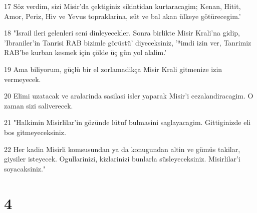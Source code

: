 \par 17 Söz verdim, sizi Misir'da çektiginiz sikintidan kurtaracagim; Kenan, Hitit, Amor, Periz, Hiv ve Yevus topraklarina, süt ve bal akan ülkeye götürecegim.'
\par 18 "Israil ileri gelenleri seni dinleyecekler. Sonra birlikte Misir Krali'na gidip, 'Ibraniler'in Tanrisi RAB bizimle görüstü' diyeceksiniz, 'ªimdi izin ver, Tanrimiz RAB'be kurban kesmek için çölde üç gün yol alalim.'
\par 19 Ama biliyorum, güçlü bir el zorlamadikça Misir Krali gitmenize izin vermeyecek.
\par 20 Elimi uzatacak ve aralarinda sasilasi isler yaparak Misir'i cezalandiracagim. O zaman sizi saliverecek.
\par 21 "Halkimin Misirlilar'in gözünde lütuf bulmasini saglayacagim. Gittiginizde eli bos gitmeyeceksiniz.
\par 22 Her kadin Misirli komsusundan ya da konugundan altin ve gümüs takilar, giysiler isteyecek. Ogullarinizi, kizlarinizi bunlarla süsleyeceksiniz. Misirlilar'i soyacaksiniz."

\chapter{4}

